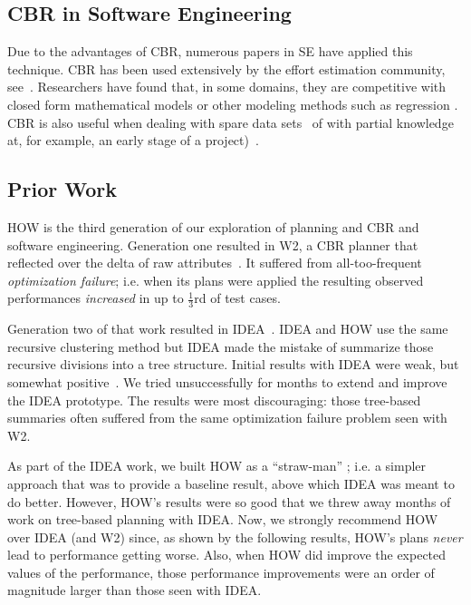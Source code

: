 \documentclass[conference]{IEEEtran}
\begin{document}
\subsection{CBR in Software Engineering}
Due to the advantages of CBR, numerous papers in SE
have applied this technique.    CBR  has been used extensively by the effort estimation community, see~\cite{keung2008analogy, 6600685, walkerden1999empirical, shepperd1997estimating, kocaguneli2010use}. 
Researchers have found that, in some domains, they are competitive with  closed form mathematical models or other modeling methods such as regression \cite{keung2008analogy}. 
CBR is also useful when dealing with spare data sets~\cite{1438374} of with 
partial knowledge  at, for example,  an early stage of a project)~\cite{walkerden1999empirical}. 

\subsection{Prior Work}

HOW is the third
generation of our exploration of  planning and CBR and software engineering.
Generation one  resulted in
 W2, a CBR planner that reflected over the delta of raw  attributes~\cite{6600685}. It suffered from all-too-frequent {\em optimization failure}; i.e. when its plans were applied the resulting observed
performances {\em increased} in up to $\frac{1}{3}$rd of test cases.

Generation two of that work resulted in  IDEA~\cite{me12c}.
IDEA and HOW use the    same recursive clustering
method but IDEA made the mistake of  summarize those
recursive divisions into a tree structure. Initial results with IDEA were weak, but somewhat
positive~\cite{me12c}. We tried unsuccessfully for  months to extend and improve
the IDEA prototype. The results were most discouraging: those tree-based summaries often suffered
from the same optimization failure problem seen with W2. 

As part of the IDEA work, we built HOW as a ``straw-man'' ; i.e. a  simpler
approach that was  to provide a baseline result,  above which IDEA was meant
to do better.   However, HOW's results were so good that we  threw away months
of work on tree-based planning with IDEA. Now, we strongly recommend HOW
over IDEA (and W2) since, as shown by the following results, HOW's plans {\em never} lead to performance getting worse. Also, when HOW did improve the expected values of the performance,
those performance improvements were an order of magnitude larger than those seen
with IDEA.
\end{document}
